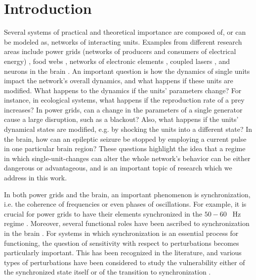 \section{Introduction}\label{sec:intro}
Several systems of practical and theoretical importance are composed of, or can be modeled as, networks of interacting units. Examples from different research areas include power grids (networks of producers and consumers of electrical energy) \cite{motter2013spontaneous}, food webs \cite{dunne2002foodweb}, networks of electronic elements \cite{crotty2010josephson}, coupled lasers \cite{nixon2011synchronized}, and neurons in the brain \cite{varela2001brainweb}. An important question is how the dynamics of single units impact the network's overall dynamics, and what happens if these units are modified. What happens to the dynamics if the units' parameters change? For instance, in ecological systems, what happens if the reproduction rate of a prey increases? In power grids, can a change in the parameters of a single generator cause a large disruption, such as a blackout? Also, what happens if the units' dynamical states are modified, e.g. by shocking the units into a different state? In the brain, how can an epileptic seizure be stopped by employing a current pulse in one particular brain region? These questions highlight the idea that a regime in which single-unit-changes can alter the whole network's behavior can be either dangerous or advantageous, and is an important topic of research which we address in this work.

In both power grids and the brain, an important phenomenon is synchronization, i.e. the coherence of frequencies or even phases of oscillations. For example, it is crucial for power grids to have their elements synchronized in the $50-60$ \SI{}{\hertz} regime \cite{witthaut2022collective}. Moreover, several functional roles have been ascribed to synchronization in the brain \cite{fries2015rhythms, varela2001brainweb, singer1999neuronal}.  For systems in which synchronization is an essential process for functioning, the question of sensitivity with respect to perturbations becomes particularly important. This has been recognized in the literature, and various types of perturbations have been considered to study the vulnerability either of the synchronized state itself or of the transition to synchronization \cite{pikovsky2001synchronization, arenas2008synchronization}.

